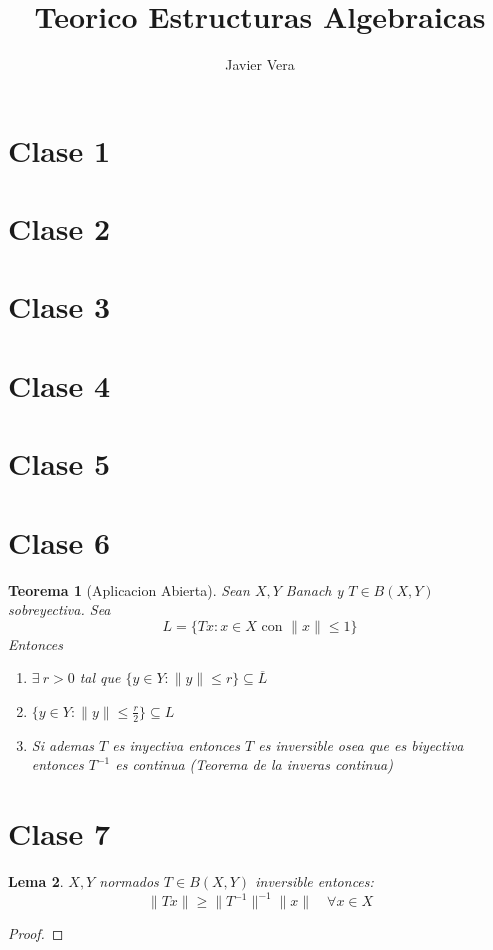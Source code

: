 \documentclass[10pt]{extarticle}
\theoremstyle{break}
\newtheorem{theorem}{Teorema}[section]
\newtheorem{lemma}[theorem]{Lema}
\theoremstyle{definition}
\begin{document}
\title{Teorico Estructuras Algebraicas}
\author{Javier Vera}
\maketitle

\section{Clase 1}
\section{Clase 2}
\section{Clase 3}
\section{Clase 4}
\section{Clase 5}
\section{Clase 6}

\begin{theorem}[Aplicacion Abierta]
	Sean $X,Y$ Banach y $T\in B( X,Y) $ sobreyectiva. Sea $$L=\{Tx: x\in X \text{ con }\lVert x \rVert \leq 1\}$$ Entonces
	\begin{enumerate}
		\item $\exists \ r>0$ tal que $\{y\in Y: \lVert y \rVert \leq r\}\subseteq \overline{L}$
		\item $\{y\in Y: \lVert y \rVert \leq \frac{r}{2}\}\subseteq L$
		\item Si ademas $T$ es inyectiva entonces $T$ es inversible osea que es biyectiva entonces $T^{-1}$ es continua (Teorema de la inveras continua)  
	\end{enumerate}
	
\end{theorem}

\section{Clase 7}

\begin{lemma}
	$X,Y$ normados $T\in B( X,Y) $ inversible entonces:
	$$\lVert Tx \rVert \geq \lVert T^{-1} \rVert^{-1}\lVert x \rVert \quad \forall x\in X  $$ 
\end{lemma}
\begin{proof}
	
\end{proof}
\end{document}
